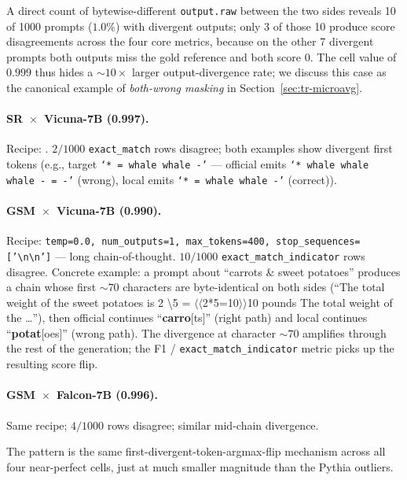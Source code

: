 \documentclass[11pt]{article}
\begin{document}
A direct count of bytewise-different \texttt{output.raw} between the
  two sides reveals 10 of 1000 prompts ($1.0\%$) with divergent
  outputs; only 3 of those 10 produce score disagreements across the
  four core metrics, because on the other 7 divergent prompts both
  outputs miss the gold reference and both score $0$.
The cell value of $0.999$ thus hides a $\sim 10\times$ larger
  output-divergence rate; we discuss this case as the canonical
  example of \emph{both-wrong masking} in
  Section~\ref{sec:tr-microavg}.

\paragraph{SR~$\times$~Vicuna-7B (0.997).}
Recipe: .
$2/1000$ \texttt{exact\_match} rows disagree; both examples show
  divergent first tokens (e.g., target
  \texttt{`* = whale whale -'} --- official emits
  \texttt{`* whale whale whale - = -'} (wrong), local emits
  \texttt{`* = whale whale -'} (correct)).

\paragraph{GSM~$\times$~Vicuna-7B (0.990).}
Recipe: \texttt{temp=0.0, num\_outputs=1, max\_tokens=400,
  stop\_sequences=['\textbackslash n\textbackslash n']} --- long
  chain-of-thought.
$10/1000$ \texttt{exact\_match\_indicator} rows disagree.
Concrete example: a prompt about ``carrots \& sweet potatoes''
  produces a chain whose first $\sim 70$ characters are byte-identical
  on both sides
  (``The total weight of the sweet potatoes is 2 \textbackslash * 5 =
  $\langle\langle$2*5=10$\rangle\rangle$10 pounds The total weight of
  the \dots''),
  then official continues
  ``\textbf{carro}[ts]'' (right path) and local continues
  ``\textbf{potat}[oes]'' (wrong path).
The divergence at character $\sim 70$ amplifies through the rest of
  the generation; the F1 / \texttt{exact\_match\_indicator} metric
  picks up the resulting score flip.

\paragraph{GSM~$\times$~Falcon-7B (0.996).}
Same recipe; $4/1000$ rows disagree; similar mid-chain divergence.

The pattern is the same first-divergent-token-argmax-flip mechanism
  across all four near-perfect cells, just at much smaller magnitude
  than the Pythia outliers.
\end{document}

